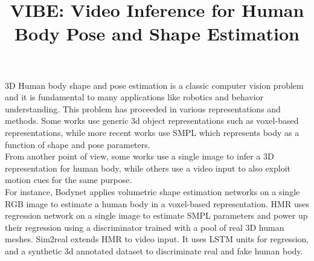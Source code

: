 \documentclass[extendedabs]{bmvc2k}
\begin{document}
\title{VIBE: Video Inference for Human Body Pose and Shape Estimation}

%


\maketitle


\noindent
3D Human body shape and pose estimation is a classic computer vision problem and it is fundamental to many applications like robotics and behavior understanding. This problem has proceeded in various representations and methods. Some works use generic 3d object representations such as voxel-based representations, while more recent works use SMPL \cite{loper2015smpl} which represents body as a function of shape and pose parameters.\\
From another point of view, some works use a single image to infer a 3D representation for human body, while others use a video input to also exploit motion cues for the same purpose.\\
For instance, Bodynet \cite{varol2018bodynet} applies volumetric shape estimation networks on a single RGB image to estimate a human body in a voxel-based representation. HMR\cite{kanazawa2018end} uses regression network on a single image to estimate SMPL parameters and power up their regression using a discriminator trained with a pool of real 3D human meshes. Sim2real\cite{doersch2019sim2real} extends HMR to video input. It uses LSTM units for regression, and a synthetic 3d annotated dataset to discriminate real and fake human body.
\end{document}
